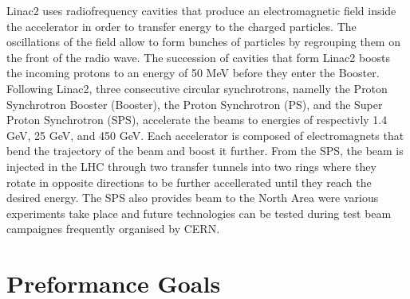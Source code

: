     Linac2 uses radiofrequency cavities that produce an electromagnetic field inside the accelerator in order to transfer energy to the charged particles. The oscillations of the field allow to form bunches of particles by regrouping them on the front of the radio wave. The succession of cavities that form Linac2 boosts the incoming protons to an energy of 50 MeV before they enter the Booster. \\

    Following Linac2, three consecutive circular synchrotrons, namelly the Proton Synchrotron Booster (Booster), the Proton Synchrotron (PS), and the Super Proton Synchrotron (SPS), accelerate the beams to energies of respectivly 1.4 GeV, 25 GeV, and 450 GeV. Each accelerator is composed of electromagnets that bend the trajectory of the beam and boost it further. From the SPS, the beam is injected in the LHC through two transfer tunnels into two rings where they rotate in opposite directions to be further accellerated until they reach the desired energy. The SPS also provides beam to the North Area were various experiments take place and future technologies can be tested during test beam campaignes frequently organised by CERN.

	\section{Preformance Goals}

